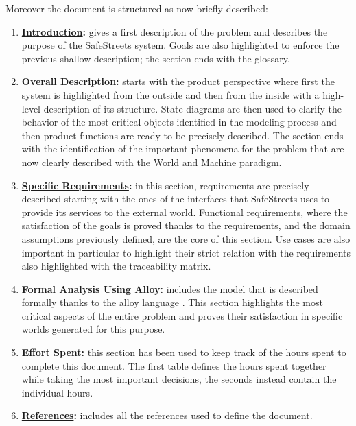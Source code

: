 	Moreover the document is structured as now briefly described:
	\begin{enumerate}
		\item \textbf{\hyperref[sec:introduction]{Introduction}:} gives a first description of the problem and describes the purpose of the SafeStreets system. Goals are also highlighted to enforce the previous shallow description; the section ends with the glossary.
		
		\item \textbf{\hyperref[sec:overallDescription]{Overall Description}:} starts with the product perspective where first the system is highlighted from the outside and then from the inside with a high-level description of its structure. State diagrams are then used to clarify the behavior of the most critical objects identified in the modeling process and then product functions are ready to be precisely described. The section ends with the identification of the important phenomena for the problem that are now clearly described with the World and Machine paradigm.
		
		\item \textbf{\hyperref[sec:specificRequirements]{Specific Requirements}:} in this section, requirements are precisely described starting with the ones of the interfaces that SafeStreets uses to provide its services to the external world. Functional requirements, where the satisfaction of the goals is proved thanks to the requirements, and the domain assumptions previously defined, are the core of this section. Use cases are also important in particular to highlight their strict relation with the requirements also highlighted with the traceability matrix.
		
		\item \textbf{\hyperref[sec:formalAnalysisUsingAlloy]{Formal Analysis Using Alloy}:} includes the model that is described formally thanks to the alloy language \cite{Alloy}. This section highlights the most critical aspects of the entire problem and proves their satisfaction in specific worlds generated for this purpose.
		
		\item \textbf{\hyperref[sec:effortSpent]{Effort Spent}:} this section has been used to keep track of the hours spent to complete this document. The first table defines the hours spent together while taking the most important decisions, the seconds instead contain the individual hours.
		
		\item \textbf{\hyperref[sec:references]{References}:} includes all the references used to define the document.
	\end{enumerate}
